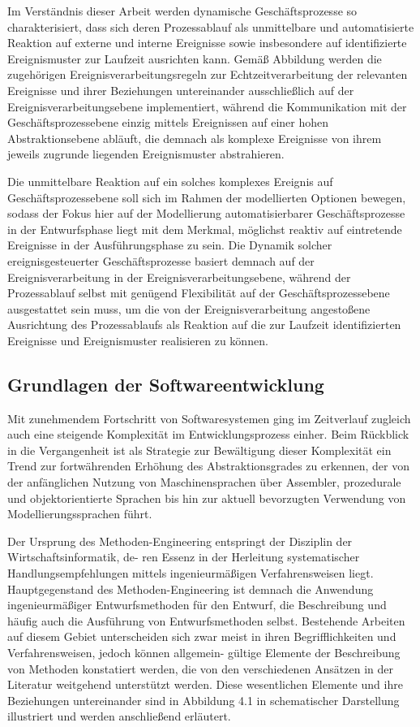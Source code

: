Im Verständnis dieser Arbeit werden dynamische Geschäftsprozesse so charakterisiert, dass sich deren Prozessablauf als unmittelbare und automatisierte Reaktion auf externe und interne Ereignisse sowie insbesondere auf identifizierte Ereignismuster zur Laufzeit ausrichten kann. Gemäß Abbildung \todo{} werden die zugehörigen Ereignisverarbeitungsregeln zur Echtzeitverarbeitung der relevanten Ereignisse und ihrer Beziehungen untereinander ausschließlich auf der Ereignisverarbeitungsebene implementiert, während die Kommunikation mit der Geschäftsprozessebene einzig mittels Ereignissen auf einer hohen Abstraktionsebene abläuft, die demnach als komplexe Ereignisse von ihrem jeweils zugrunde liegenden Ereignismuster abstrahieren.

Die unmittelbare Reaktion auf ein solches komplexes Ereignis auf Geschäftsprozessebene soll sich im Rahmen der modellierten Optionen bewegen, sodass der Fokus hier auf der Modellierung automatisierbarer Geschäftsprozesse in der Entwurfsphase liegt mit dem Merkmal, möglichst reaktiv auf eintretende Ereignisse in der Ausführungsphase zu sein. Die Dynamik solcher ereignisgesteuerter Geschäftsprozesse basiert demnach auf der Ereignisverarbeitung in der Ereignisverarbeitungsebene, während der Prozessablauf selbst mit genügend Flexibilität auf der Geschäftsprozessebene ausgestattet sein muss, um die von der Ereignisverarbeitung angestoßene Ausrichtung des Prozessablaufs als Reaktion auf die zur Laufzeit identifizierten Ereignisse und Ereignismuster realisieren zu können.

\subsection{Grundlagen der Softwareentwicklung}
Mit zunehmendem Fortschritt von Softwaresystemen ging im Zeitverlauf zugleich auch eine steigende Komplexität im Entwicklungsprozess einher. Beim Rückblick in die Vergangenheit ist als Strategie zur Bewältigung dieser Komplexität ein Trend zur fortwährenden Erhöhung des Abstraktionsgrades zu erkennen, der von der anfänglichen Nutzung von Maschinensprachen über Assembler, prozedurale und objektorientierte Sprachen bis hin zur aktuell bevorzugten Verwendung von Modellierungssprachen führt.

Der Ursprung des Methoden-Engineering entspringt der Disziplin der Wirtschaftsinformatik, de- ren Essenz in der Herleitung systematischer Handlungsempfehlungen mittels ingenieurmäßigen Verfahrensweisen liegt. Hauptgegenstand des Methoden-Engineering ist demnach die Anwendung ingenieurmäßiger Entwurfsmethoden für den Entwurf, die Beschreibung und häufig auch die Ausführung von Entwurfsmethoden selbst. Bestehende Arbeiten auf diesem Gebiet unterscheiden sich zwar meist in ihren Begrifflichkeiten und Verfahrensweisen, jedoch können allgemein- gültige Elemente der Beschreibung von Methoden konstatiert werden, die von den verschiedenen Ansätzen in der Literatur weitgehend unterstützt werden. Diese wesentlichen Elemente und ihre Beziehungen untereinander sind in Abbildung 4.1 in schematischer Darstellung illustriert und werden anschließend erläutert. 

